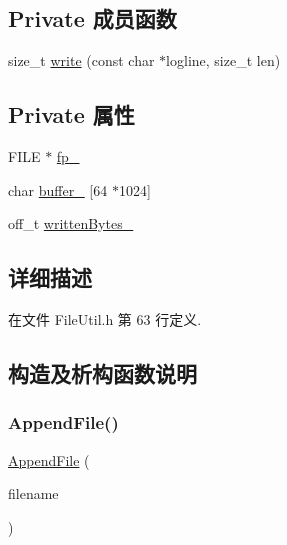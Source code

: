 \subsection*{Private 成员函数}
\begin{DoxyCompactItemize}
\item 
size\+\_\+t \hyperlink{classmuduo_1_1FileUtil_1_1AppendFile_abbaf356e78e65b65c159b1bebd48b35c}{write} (const char $\ast$logline, size\+\_\+t len)
\end{DoxyCompactItemize}
\subsection*{Private 属性}
\begin{DoxyCompactItemize}
\item 
F\+I\+LE $\ast$ \hyperlink{classmuduo_1_1FileUtil_1_1AppendFile_ada014bcf13679d8e22d88571b0f11275}{fp\+\_\+}
\item 
char \hyperlink{classmuduo_1_1FileUtil_1_1AppendFile_ab9024ec17112436406b01257ef4a373c}{buffer\+\_\+} \mbox{[}64 $\ast$1024\mbox{]}
\item 
off\+\_\+t \hyperlink{classmuduo_1_1FileUtil_1_1AppendFile_ac5d5b6f9bd491ad2f7168b56f95f9f16}{written\+Bytes\+\_\+}
\end{DoxyCompactItemize}


\subsection{详细描述}


在文件 File\+Util.\+h 第 63 行定义.



\subsection{构造及析构函数说明}
\mbox{\label{classmuduo_1_1FileUtil_1_1AppendFile_afab98ee95471530b1192c3d0fd4bdabf}} 
\subsubsection{\texorpdfstring{Append\+File()}{AppendFile()}}
{\footnotesize\ttfamily \hyperlink{classmuduo_1_1FileUtil_1_1AppendFile}{Append\+File} (\begin{DoxyParamCaption}\item[{\hyperlink{classmuduo_1_1StringArg}{String\+Arg}}]{filename }\end{DoxyParamCaption})\hspace{0.3cm}{\ttfamily [explicit]}}

